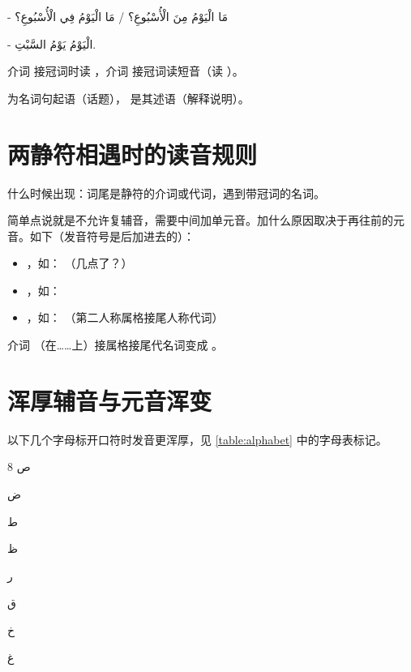 \begin{Arabic}  
    - مَا الْيَوْمُ مِنَ الْأُسْبُوعِ؟ / مَا الْيَوْمُ فِي الْأُسْبُوعِ؟

    - الْيَوْمُ يَوْمُ السَّبْتِ.
\end{Arabic}

\begin{attention}
    介词  接冠词时读 ，介词  接冠词读短音（读  ）。

     为名词句起语（话题），  是其述语（解释说明）。
\end{attention}

\section{ 两静符相遇时的读音规则}

什么时候出现：词尾是静符的介词或代词，遇到带冠词的名词。

简单点说就是不允许复辅音，需要中间加单元音。加什么原因取决于再往前的元音。如下（发音符号是后加进去的）：

\begin{itemize}
    \item {}，如：  \tto {}（几点了？）
    \item {}，如：  \tto {}
    \item {}，如： （第二人称属格接尾人称代词）\tto {}
\end{itemize}

\begin{attention}
    介词  （在……上）接属格接尾代名词变成 。
\end{attention}

\section{ 浑厚辅音与元音浑变}

以下几个字母标开口符时发音更浑厚，见 \ref{table:alphabet} 中的字母表标记。

\begin{Arabic}
    \begin{multicols}{8}
        ص

        ض

        ط

        ظ

        ر

        ق

        خ

        غ
    \end{multicols}
\end{Arabic}

